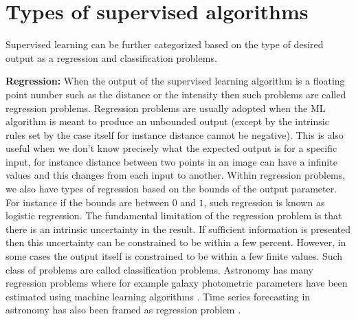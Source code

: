 \section{Types of supervised algorithms}
\label{sec:classifcation and regression}
Supervised learning can be further categorized based on the type of desired output as a regression and classification problems.

\textbf{Regression:} 
When the output of the supervised learning algorithm is a floating point number such as the distance or the intensity then such problems are called regression problems. 
Regression problems are usually adopted when the ML algorithm is meant to produce an unbounded output (except by the intrinsic rules set by the case itself for instance distance cannot be negative). 
This is also useful when we don't know precisely what the expected output is for a specific input, for instance distance between two points in an image can have a infinite values and this changes from each input to another.
Within regression problems, we also have types of regression based on the bounds of the output parameter.
For instance if the bounds are between $0$ and $1$, such regression is known as logistic regression.
The fundamental limitation of the regression problem is that there is an intrinsic uncertainty in the result. 
If sufficient information is presented then this uncertainty can be constrained to be within a few percent.
However, in some cases the output itself is constrained to be within a few finite values. 
Such class of problems are called classification problems.
Astronomy has many regression problems where for example galaxy photometric parameters have been estimated using machine learning algorithms \cite{2022YinAEparameter}.
Time series forecasting in astronomy has also been framed as regression problem \cite{2018Modred}.

